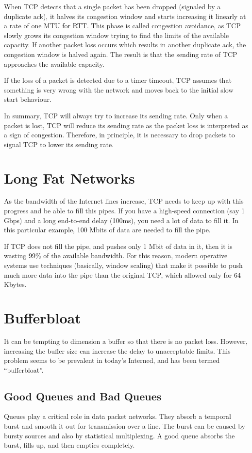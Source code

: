 When TCP detects that a single packet has been dropped (signaled by a duplicate ack), it halves its congestion window and starts increasing it linearly at a rate of one MTU for RTT.
This phase is called congestion avoidance, as TCP slowly grows its congestion window trying to find the limits of the available capacity.
If another packet loss occurs which results in another duplicate ack, the congestion window is halved again.
The result is that the sending rate of TCP approaches the available capacity.

If the loss of a packet is detected due to a timer timeout, TCP assumes that something is very wrong with the network and moves back to the initial slow start behaviour.

In summary, TCP will always try to increase its sending rate.
Only when a packet is lost, TCP will reduce its sending rate as the packet loss is interpreted as a sign of congestion.
Therefore, in principle, it is necessary to drop packets to signal TCP to lower its sending rate.

\section{Long Fat Networks}

As the bandwidth of the Internet lines increase, TCP needs to keep up with this progress and be able to fill this pipes.
If you have a high-speed connection (say 1 Gbps) and a long end-to-end delay (100ms), you need a lot of data to fill it.
In this particular example, 100 Mbits of data are needed to fill the pipe.

If TCP does not fill the pipe, and pushes only 1 Mbit of data in it, then it is wasting 99\% of the available bandwidth.
For this reason, modern operative systems use techniques (basically, window scaling) that make it possible to push much more data into the pipe than the original TCP, which allowed only for 64 Kbytes.


\section{Bufferbloat}

It can be tempting to dimension a buffer so that there is no packet loss.
However, increasing the buffer size can increase the delay to unacceptable limits.
This problem seems to be prevalent in today's Interned, and has been termed ``bufferbloat''.

\subsection{Good Queues and Bad Queues}
Queues play a critical role in data packet networks.
They absorb a temporal burst and smooth it out for transmission over a line.
The burst can be caused by bursty sources and also by statistical multiplexing.
A good queue absorbs the burst, fills up, and then empties completely.


